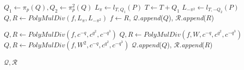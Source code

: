 \begin{algorithm}[H]
\begin{algorithmic}[1]
\State $Q_1 \leftarrow \pi_p(Q), Q_2 \leftarrow \pi_p^2(Q)$
\State $L_\pi \leftarrow l_{T,Q_1}(P)$
\State $T \leftarrow T + Q_1$
\State $L_{-\pi^2} \leftarrow l_{T,-Q_2}(P)$
\State $Q, R \leftarrow {\textit{PolyMulDiv}}(f, L_\pi, L_{-\pi^2})$ 
\State $f \leftarrow R$, $\mathcal{Q}$.\textit{append}($Q$), $\mathcal{R}$.\textit{append}($R$)

\Statex

\Statex {}

    \State $Q, R \leftarrow {\textit{PolyMulDiv}}(f, c^{-q}, c^{q^2}, c^{-q^3})$
    \State $Q, R \leftarrow {\textit{PolyMulDiv}}(f, W, c^{-q}, c^{q^2}, c^{-q^3})$
    \State $Q, R \leftarrow {\textit{PolyMulDiv}}(f, W^2, c^{-q}, c^{q^2}, c^{-q^3})$
\EndIf
\State $\mathcal{Q}$.\textit{append}($Q$), $\mathcal{R}$.\textit{append}($R$) 

\Statex

\State \Return $\mathcal{Q}, \mathcal{R}$
\end{algorithmic}
\end{algorithm}






